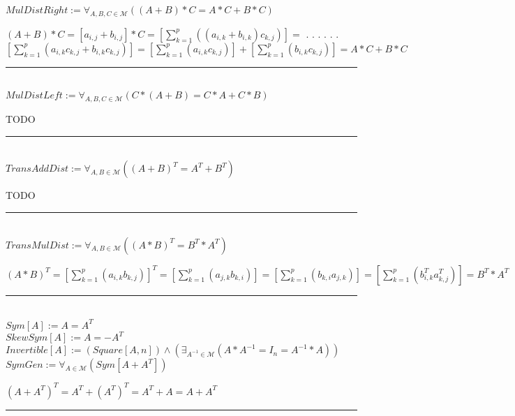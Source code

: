 \documentclass{book}
\newcommand{\abr}{:=}
\newcommand{\cont}{\phantom{.}. . .\phantom{.}}
\newcommand{\pr}[1]{\left(#1\right)}
\begin{document}
$MulDistRight \abr \forall_{A, B, C \in \mathcal{M}}\pr{(A + B) * C = A * C + B * C}$
\begin{enumerate}
  \lit $(A + B) * C = [a_{i, j} + b_{i, j}] * C = \left[\sum_{k = 1}^{p}\pr{(a_{i, k} + b_{i, k}) c_{k, j}}\right] = $ \cont
  \lit \cont $\left[\sum_{k = 1}^{p}(a_{i, k} c_{k, j} + b_{i, k} c_{k, j})\right] = \left[\sum_{k = 1}^{p}(a_{i, k} c_{k, j})\right] + \left[\sum_{k = 1}^{p}(b_{i, k} c_{k, j})\right] = A * C + B * C$
\end{enumerate} \vspace{.75mm} \hrule \vspace{.75mm} \ \\ 

$MulDistLeft \abr \forall_{A, B, C \in \mathcal{M}}\pr{C * (A + B) = C * A + C * B}$
\begin{enumerate}
  \lit TODO
\end{enumerate} \vspace{.75mm} \hrule \vspace{.75mm} \ \\ 

$TransAddDist \abr \forall_{A, B \in \mathcal{M}}\pr{(A + B)^T = A^T + B ^T}$
\begin{enumerate}
  \lit TODO
\end{enumerate} \vspace{.75mm} \hrule \vspace{.75mm} \ \\ 

$TransMulDist \abr \forall_{A, B \in \mathcal{M}}\pr{(A * B)^T = B^T * A^T}$
\begin{enumerate}
  \lit $(A * B)^T = \left[\sum_{k = 1}^{p}(a_{i, k} b_{k, j})\right]^T = \left[\sum_{k = 1}^{p}(a_{j, k} b_{k, i})\right] = \left[\sum_{k = 1}^{p}(b_{k, i} a_{j, k})\right] =  \left[\sum_{k = 1}^{p}(b^T_{i, k} a^T_{k, j})\right] = B^T * A^T$
\end{enumerate} \vspace{.75mm} \hrule \vspace{.75mm} \ \\

$Sym[A] \abr A = A^T$ \\
$SkewSym[A] \abr A = -A^T$ \\
$Invertible[A] \abr (Square[A, n]) \land \pr{\exists_{A^{-1} \in \mathcal{M}}(A * A^{-1} = I_n = A^{-1} * A)}$ \\

$SymGen \abr \forall_{A \in \mathcal{M}}(Sym[A + A^T])$
\begin{enumerate}
  \lit $(A + A^T)^T = A^T + (A^T)^T = A^T + A = A + A^T$
\end{enumerate} \vspace{.75mm} \hrule \vspace{.75mm} \ \\ 
\end{document}
